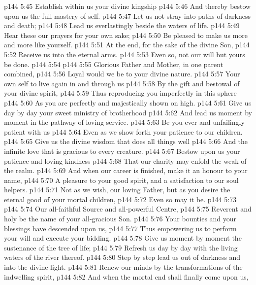 \vs p144 5:45 Establish within us your divine kingship
\vs p144 5:46 \hsetoff And thereby bestow upon us the full mastery of self.
\vs p144 5:47 Let us not stray into paths of darkness and death;
\vs p144 5:48 \hsetoff Lead us everlastingly beside the waters of life.
\vs p144 5:49 Hear these our prayers for your own sake;
\vs p144 5:50 \hsetoff Be pleased to make us more and more like yourself.
\vs p144 5:51 At the end, for the sake of the divine Son,
\vs p144 5:52 \hsetoff Receive us into the eternal arms.
\vs p144 5:53 Even so, not our will but yours be done.
\vs p144 5:54 \separatorshort
\vs p144 5:55 Glorious Father and Mother, in one parent combined,
\vs p144 5:56 \hsetoff Loyal would we be to your divine nature.
\vs p144 5:57 Your own self to live again in and through us
\vs p144 5:58 \hsetoff By the gift and bestowal of your divine spirit,
\vs p144 5:59 Thus reproducing you imperfectly in this sphere
\vs p144 5:60 \hsetoff As you are perfectly and majestically shown on high.
\vs p144 5:61 Give us day by day your sweet ministry of brotherhood
\vs p144 5:62 \hsetoff And lead us moment by moment in the pathway of loving service.
\vs p144 5:63 Be you ever and unfailingly patient with us
\vs p144 5:64 \hsetoff Even as we show forth your patience to our children.
\vs p144 5:65 Give us the divine wisdom that does all things well
\vs p144 5:66 \hsetoff And the infinite love that is gracious to every creature.
\vs p144 5:67 Bestow upon us your patience and loving\hyp{}kindness
\vs p144 5:68 \hsetoff That our charity may enfold the weak of the realm.
\vs p144 5:69 And when our career is finished, make it an honour to your name,
\vs p144 5:70 \hsetoff A pleasure to your good spirit, and a satisfaction to our soul helpers.
\vs p144 5:71 Not as we wish, our loving Father, but as you desire the eternal good of your mortal children,
\vs p144 5:72 \hsetoff Even so may it be.
\vs p144 5:73 \separatorshort
\vs p144 5:74 Our all\hyp{}faithful Source and all\hyp{}powerful Centre,
\vs p144 5:75 \hsetoff Reverent and holy be the name of your all\hyp{}gracious Son.
\vs p144 5:76 Your bounties and your blessings have descended upon us,
\vs p144 5:77 \hsetoff Thus empowering us to perform your will and execute your bidding.
\vs p144 5:78 Give us moment by moment the sustenance of the tree of life;
\vs p144 5:79 \hsetoff Refresh us day by day with the living waters of the river thereof.
\vs p144 5:80 Step by step lead us out of darkness and into the divine light.
\vs p144 5:81 \hsetoff Renew our minds by the transformations of the indwelling spirit,
\vs p144 5:82 And when the mortal end shall finally come upon us,
